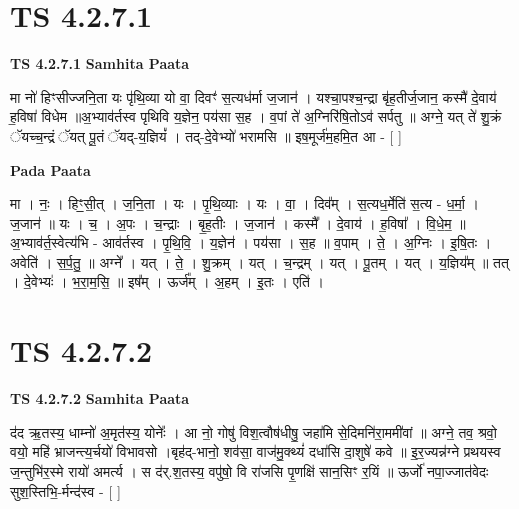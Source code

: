 \documentclass[17pt]{extarticle}
\begin{document}

\section{ TS 4.2.7.1 }

\textbf{TS 4.2.7.1 } \newline
\textbf{Samhita Paata} \newline

मा नो॑ हिꣳसीज्जनि॒ता यः पृ॑थि॒व्या यो वा॒ दिवꣳ॑ स॒त्यध॑र्मा ज॒जान॑ । यश्चा॒पश्च॒न्द्रा बृ॑ह॒तीर्ज॒जान॒ कस्मै॑ दे॒वाय॑ ह॒विषा॑ विधेम ॥अ॒भ्याव॑र्तस्व पृथिवि य॒ज्ञेन॒ पय॑सा स॒ह । व॒पां ते॑ अ॒ग्निरि॑षि॒तोऽव॑ सर्पतु ॥ अग्ने॒ यत् ते॑ शु॒क्रं ॅयच्च॒न्द्रं ॅयत् पू॒तं ॅयद्-य॒ज्ञियं᳚ । तद्-दे॒वेभ्यो॑ भरामसि ॥ इष॒मूर्ज॑म॒हमि॒त आ - [  ] \newline

\textbf{Pada Paata} \newline

मा । नः॒ । हिꣳ॒॒सी॒त् । ज॒नि॒ता । यः । पृ॒थि॒व्याः । यः । वा॒ । दिव᳚म् । स॒त्यध॒र्मेति॑ स॒त्य - ध॒र्मा॒ । ज॒जान॑ ॥ यः । च॒ । अ॒पः । च॒न्द्राः । बृ॒ह॒तीः । ज॒जान॑ । कस्मै᳚ । दे॒वाय॑ । ह॒विषा᳚ । वि॒धे॒म॒ ॥ अ॒भ्याव॑र्त॒स्वेत्य॑भि - आव॑र्तस्व । पृ॒थि॒वि॒ । य॒ज्ञेन॑ । पय॑सा । स॒ह ॥ व॒पाम् । ते॒ । अ॒ग्निः । इ॒षि॒तः । अवेति॑ । स॒र्प॒तु॒ ॥ अग्ने᳚ । यत् । ते॒ । शु॒क्रम् । यत् । च॒न्द्रम् । यत् । पू॒तम् । यत् । य॒ज्ञिय᳚म् ॥ तत् । दे॒वेभ्यः॑ । भ॒रा॒म॒सि॒ ॥ इष᳚म् । ऊर्ज᳚म् । अ॒हम् । इ॒तः । एति॑ ।  \newline





\section{ TS 4.2.7.2 }

\textbf{TS 4.2.7.2 } \newline
\textbf{Samhita Paata} \newline

द॑द ऋ॒तस्य॒ धाम्नो॑ अ॒मृत॑स्य॒ योनेः᳚ । आ नो॒ गोषु॑ विश॒त्वौष॑धीषु॒ जहा॑मि से॒दिमनि॑रा॒ममी॑वां ॥ अग्ने॒ तव॒ श्रवो॒ वयो॒ महि॑ भ्राजन्त्य॒र्चयो॑ विभावसो ।बृह॑द्-भानो॒ शव॑सा॒ वाज॑मु॒क्थ्यं॑ दधा॑सि दा॒शुषे॑ कवे ॥ इ॒र॒ज्यन्न॑ग्ने प्रथयस्व ज॒न्तुभि॑र॒स्मे रायो॑ अमर्त्य । स द॑र्.श॒तस्य॒ वपु॑षो॒ वि रा॑जसि पृ॒णक्षि॑ सान॒सिꣳ र॒यिं ॥ ऊर्जो॑ नपा॒ज्जात॑वेदः सुश॒स्तिभि॒-र्मन्द॑स्व - [  ] \newline
\end{document}
